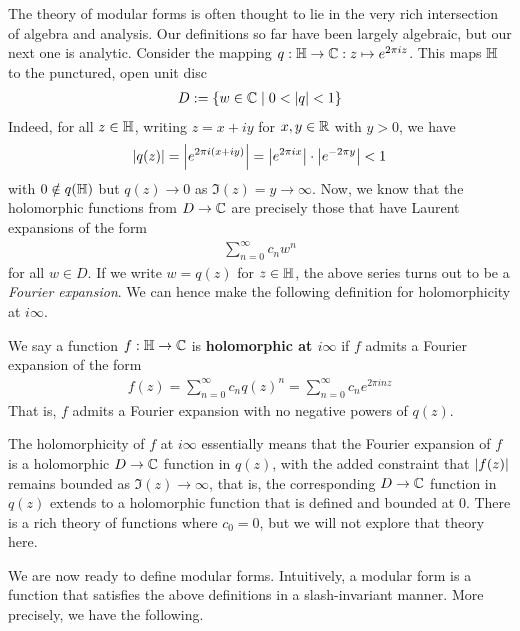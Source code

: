 The theory of modular forms is often thought to lie in the very rich intersection of algebra and analysis. Our definitions so far have been largely algebraic, but our next one is analytic. Consider the mapping $q : \mathbb{H} \to \mathbb{C} : z \mapsto e^{2\pi i z}$. This maps $\mathbb{H}$ to the punctured, open unit disc
\begin{align*}
    D := \left\{ w \in \mathbb{C} \; \middle\vert \; 0 < \left\lvert q \right\rvert < 1 \right\}
\end{align*}
Indeed, for all $z \in \mathbb{H}$, writing $z = x + iy$ for $x, y \in \mathbb{R}$ with $y > 0$, we have
\begin{align*}
    \left\lvert q(z) \right\rvert = \left\lvert e^{2 \pi i \left( x + iy \right)} \right\rvert = \left\lvert e^{2\pi i x} \right\rvert \cdot \left\lvert e^{-2\pi y} \right\rvert < 1
\end{align*}
with $0 \notin q\!\left( \mathbb{H} \right)$ but $q(z) \to 0$ as $\Im(z) = y \to \infty$. Now, we know that the holomorphic functions from $D \to \mathbb{C}$ are precisely those that have Laurent expansions of the form
\begin{align*}
    \sum_{n=0}^{\infty} c_n w^n
\end{align*}
for all $w \in D$. If we write $w = q(z)$ for $z \in \mathbb{H}$, the above series turns out to be a \textit{Fourier expansion}. We can hence make the following definition for holomorphicity at $i\infty$.

\begin{boxdefinition}\label{Ch2:Def:Holo_at_ImInfty}
    We say a function $f : \mathbb{H} \to \mathbb{C}$ is \textbf{holomorphic at $i\infty$} if $f$ admits a Fourier expansion of the form
    \begin{align*}
        f(z) = \sum_{n=0}^{\infty} c_n q(z)^n = \sum_{n=0}^{\infty} c_n e^{2\pi i nz}
    \end{align*}
    That is, $f$ admits a Fourier expansion with no negative powers of $q(z)$.
\end{boxdefinition}

The holomorphicity of $f$ at $i\infty$ essentially means that the Fourier expansion of $f$ is a holomorphic $D \to \mathbb{C}$ function in $q(z)$, with the added constraint that $\left\lvert f(z) \right\rvert$ remains bounded as $\Im(z) \to \infty$, that is, the corresponding $D \to \mathbb{C}$ function in $q(z)$ extends to a holomorphic function that is defined and bounded at $0$. There is a rich theory of functions where $c_0 = 0$, but we will not explore that theory here.

We are now ready to define modular forms. Intuitively, a modular form is a function that satisfies the above definitions in a slash-invariant manner. More precisely, we have the following.

